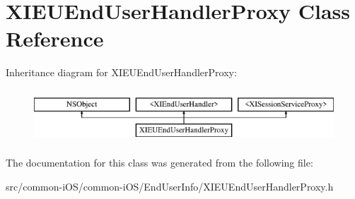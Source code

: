 \hypertarget{interface_x_i_e_u_end_user_handler_proxy}{}\section{X\+I\+E\+U\+End\+User\+Handler\+Proxy Class Reference}
\label{interface_x_i_e_u_end_user_handler_proxy}
Inheritance diagram for X\+I\+E\+U\+End\+User\+Handler\+Proxy\+:\begin{figure}[H]
\begin{center}
\leavevmode
\includegraphics[height=2.000000cm]{interface_x_i_e_u_end_user_handler_proxy}
\end{center}
\end{figure}


The documentation for this class was generated from the following file\+:\begin{DoxyCompactItemize}
\item 
src/common-\/i\+O\+S/common-\/i\+O\+S/\+End\+User\+Info/X\+I\+E\+U\+End\+User\+Handler\+Proxy.\+h\end{DoxyCompactItemize}

